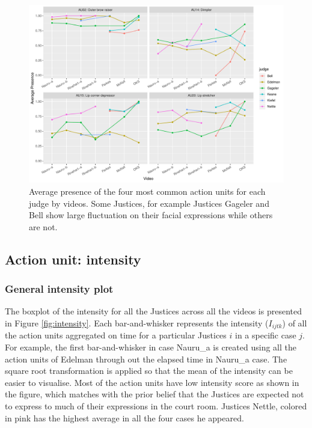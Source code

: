 \documentclass{monashthesis}
\begin{document}
\begin{figure}

{\centering \includegraphics[width=1\linewidth]{figures/au-video-1} 

}

\caption{Average presence of the four most common action units for each judge by videos. Some Justices, for example Justices Gageler and Bell show large fluctuation on their facial expressions while others are not. \label{fig:common_video}}\label{fig:au-video}
\end{figure}

\hypertarget{action-unit-intensity}{%
\subsection{Action unit: intensity}\label{action-unit-intensity}}

\hypertarget{general-intensity-plot}{%
\subsubsection{General intensity plot}\label{general-intensity-plot}}

The boxplot of the intensity for all the Justices across all the videos is presented in Figure \ref{fig:intensity}. Each bar-and-whisker represents the intensity (\(I_{ijtk}\)) of all the action units aggregated on time for a particular Justices \(i\) in a specific case \(j\). For example, the first bar-and-whisker in case Nauru\_a is created using all the action units of Edelman through out the elapsed time in Nauru\_a case. The square root transformation is applied so that the mean of the intensity can be easier to visualise. Most of the action units have low intensity score as shown in the figure, which matches with the prior belief that the Justices are expected not to express to much of their expressions in the court room. Justices Nettle, colored in pink has the highest average in all the four cases he appeared.
\end{document}
